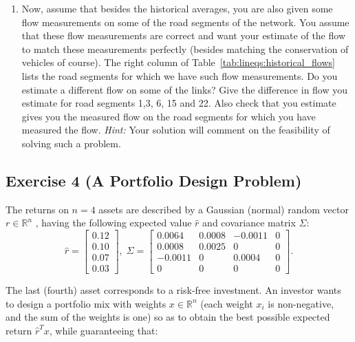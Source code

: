 \documentclass[11pt]{article}
\begin{document}
\begin{enumerate}
\item Now, assume that besides the historical averages, you are also given some flow measurements on some of the road segments of the network. You assume that these flow measurements are correct and want your estimate of the flow to match these measurements perfectly (besides matching the conservation of vehicles of course). The right column of
Table~\ref{tab:lineqs:historical_flows}
lists the road segments for which we have such flow measurements. Do you estimate a different flow on some of the links? Give the difference in flow you estimate for road segments 1,3, 6, 15 and 22. Also check that you estimate gives you the measured flow on the road segments for which you have measured the flow. {\em Hint:} Your solution will comment on the feasibility of solving such a problem.

\end{enumerate}

\begin{solution}
\end{solution}

\newpage
\subsection*{Exercise 4 (A Portfolio Design Problem)}

The returns on $n = 4$ assets are described by a Gaussian (normal) random vector $r \in \mathbb{R}^n$ , having the following expected value $\hat{r}$ and covariance matrix $\Sigma$:
\[
\hat{r} =
\begin{bmatrix}
    0.12  \\
    0.10  \\
    0.07 \\
    0.03

\end{bmatrix}, \; \Sigma =
\begin{bmatrix}
    0.0064 & 0.0008 & -0.0011  & 0 \\
    0.0008 & 0.0025 & 0  & 0 \\
    -0.0011 & 0 & 0.0004  & 0 \\
    0 & 0 & 0  & 0

\end{bmatrix}
.
\]


The last (fourth) asset corresponds to a risk-free investment. An investor
wants to design a portfolio mix with weights $x \in \mathbb{R}^n$ (each weight $x_i$
is non-negative, and the sum of the weights is one) so as to obtain the best possible expected return $\hat{r}^Tx$, while guaranteeing that: \\
\end{document}
